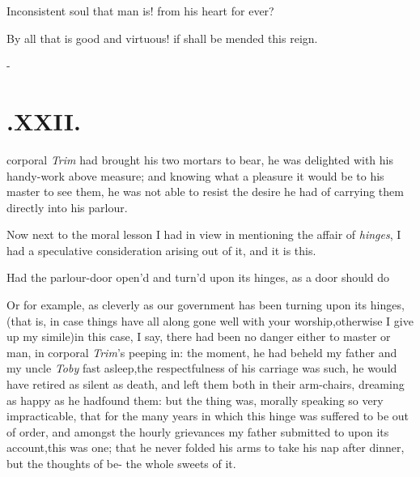 \documentclass{article}
\begin{document}
\tsh Inconsistent soul that man is!\tsk
{} 
from his heart for ever?

By all that is good and virtuous! if 
shall be mended this reign.

\null\kern-\baselineskip
\section{.\quad  XXII.}

 corporal \textit{Trim} had brought
his two mortars to bear, he was delighted with his handy-work
above\break
measure; and knowing what a pleasure it would be to his master to
see them, he was not able to resist the desire he had of carrying
them directly into his parlour.

Now next to the moral lesson I had in view in mentioning the
affair of \textit{hinges}, I had a speculative consideration arising
out of it, and it is this.

Had the parlour-door open’d and\break
turn’d upon its hinges, as a door should do\tsh{}

\tsk Or for example, as cleverly as our government has been
turning upon its hinges,\tsh (that is, in case things have all
along gone well with your worship,\tsk otherwise I give up my
simile)\tsk in this case, I say, there had been no danger either
to master or man, in corporal \textit{Trim}’s peeping in: the
moment, he had beheld my father and my uncle \textit{Toby} fast
asleep,\break\tsk the respectfulness of his carriage was such,
he would have retired as silent as death, and left them both in
their arm-chairs, dreaming as happy as he had\break found them:
but the thing was, morally speaking so very impracticable, that
for the many years in which this hinge was suffered to be out of
order, and amongst the hourly grievances my father submitted to
upon its account,\tsk this was one; that he never folded his
arms to take his nap after dinner, but the thoughts of be-
the whole sweets of it.
\end{document}
